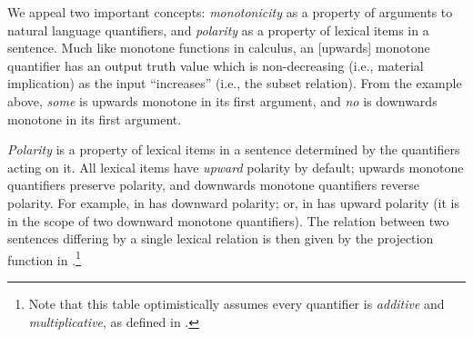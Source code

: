 We appeal two important concepts: \textit{monotonicity} as a
  property of arguments to natural language quantifiers,
  and \textit{polarity}
  as a property of lexical items in a sentence.
Much like monotone functions in calculus,
  an [upwards] monotone quantifier has an output truth value which is
  non-decreasing (i.e., material implication)
  as the input ``increases'' (i.e., the subset relation).
From the example above, \textit{some} is upwards monotone in its first
  argument, and \textit{no} is downwards monotone in its first argument.

%

\textit{Polarity} is
  a property of lexical items in a sentence determined by the
  quantifiers acting on it.
All lexical items have \textit{upward} polarity by default;
  upwards monotone quantifiers preserve polarity,
  and downwards monotone quantifiers reverse polarity.
For example,  in  has downward polarity; or,
   in  has upward polarity
  (it is in the scope of two downward monotone quantifiers).
The relation between two sentences differing by a single lexical
  relation is then given by the projection function in
  .\footnote{
    Note that this table optimistically assumes every quantifier is
    \textit{additive} and \textit{multiplicative}, as defined
    in .
  }


